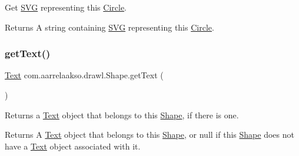 Get \hyperlink{classcom_1_1aarrelaakso_1_1drawl_1_1_s_v_g}{S\+VG} representing this \hyperlink{classcom_1_1aarrelaakso_1_1drawl_1_1_circle}{Circle}. 

\begin{DoxyReturn}{Returns}
A string containing \hyperlink{classcom_1_1aarrelaakso_1_1drawl_1_1_s_v_g}{S\+VG} representing this \hyperlink{classcom_1_1aarrelaakso_1_1drawl_1_1_circle}{Circle}. 
\end{DoxyReturn}
\mbox{\label{classcom_1_1aarrelaakso_1_1drawl_1_1_shape_a6f876978d4102974fedc5b41c93c7b26}} 
\subsubsection{\texorpdfstring{get\+Text()}{getText()}}
{\footnotesize\ttfamily \hyperlink{classcom_1_1aarrelaakso_1_1drawl_1_1_text}{Text} com.\+aarrelaakso.\+drawl.\+Shape.\+get\+Text (\begin{DoxyParamCaption}{ }\end{DoxyParamCaption})\hspace{0.3cm}{\ttfamily [inherited]}}



Returns a \hyperlink{classcom_1_1aarrelaakso_1_1drawl_1_1_text}{Text} object that belongs to this \hyperlink{classcom_1_1aarrelaakso_1_1drawl_1_1_shape}{Shape}, if there is one. 

\begin{DoxyReturn}{Returns}
A \hyperlink{classcom_1_1aarrelaakso_1_1drawl_1_1_text}{Text} object that belongs to this \hyperlink{classcom_1_1aarrelaakso_1_1drawl_1_1_shape}{Shape}, or {\ttfamily null} if this \hyperlink{classcom_1_1aarrelaakso_1_1drawl_1_1_shape}{Shape} does not have a \hyperlink{classcom_1_1aarrelaakso_1_1drawl_1_1_text}{Text} object associated with it. 
\end{DoxyReturn}
\mbox{\label{classcom_1_1aarrelaakso_1_1drawl_1_1_shape_aed4e9caa294aacc973b7a531a960e9e5}} 
